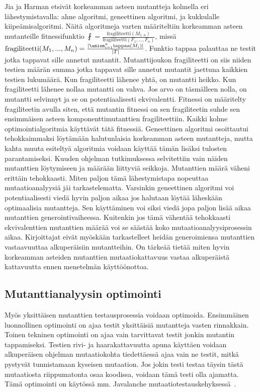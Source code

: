 \documentclass{tktltiki}
\begin{document}
Jia ja Harman etsivät korkeamman asteen mutantteja kolmella eri lähestymistavalla: ahne algoritmi, geneettinen algoritmi, ja kukkulalle kiipeämisalgoritmi. Näitä algoritmeja varten määriteltiin korkeamman asteen mutanteille fitnessifunktio $\fint = \frac{\text{fragiliteetti}({M_{1..n}})}{\text{fragiliteetti}({F_1, ..., F_n})}$, missä $\text{fragiliteetti}(M_1, ..., M_n) = \frac{|\union_{i=1}^{n} \text{tappaa}(M_i)|}{|T|}$. Funktio $\text{tappaa}$ palauttaa ne testit jotka tappavat sille annetut mutantit. Mutanttijoukon fragiliteetti on siis niiden testien määrän summa jotka tappavat sille annetut mutantit jaettuna kaikkien testien lukumäärä. Kun fragiliteetti lähenee yhtä, on mutantti heikko. Kun fragiliteetti lähenee nollaa mutantti on vahva. Jos arvo on täsmälleen nolla, on mutantti selvinnyt ja se on potentiaalisesti ekvivalentti. Fitnessi on määritelty fragiliteetin avulla siten, että mutantin fitnessi on sen fragiliteetin suhde sen ensimmäisen asteen komponenttimutanttien fragiliteettiin. Kaikki kolme optimointialgoritmia käyttävät tätä fitnessiä. Geneettinen algoritmi osoittautui tehokkaimmaksi löytämään halutunlaisia korkeamman asteen mutantteja, mutta kahta muuta esiteltyä algoritmia voidaan käyttää tämän lisäksi tulosten parantamiseksi. Kuuden ohjelman tutkimuksessa selvitettiin vain näiden mutanttien löytymiseen ja määrään liittyviä seikkoja. Mutanttien määrä väheni erittäin tehokkaasti. Miten paljon tämä lähestymistapa nopeuttaa mutaatioanalyysiä jäi tarkastelematta. Varsinkin geneettinen algoritmi voi potentiaalisesti viedä hyvin paljon aikaa jos halutaan löytää läheskään optimaalisia mutantteja. Sen käyttäminen voi siksi viedä jopa paljon lisää aikaa mutanttien generointivaiheessa. Kuitenkin jos tämä vähentää tehokkaasti ekvivalenttien mutanttien määrää voi se säästää koko mutaatioanalyysiprosessin aikaa. Kirjoittajat eivät myöskään tarkastelleet heidän generoimiensa mutanttien vastaavuuttaa alkuperäisiin mutantteihin. On tärkeää tietää miten hyvin korkeamman asteiden mutanttien mutaatiokattavuus vastaa alkuperäistä kattavuutta ennen menetelmän käyttöönottoa.

\subsection{Mutanttianalyysin optimointi}
Myös yksittäisen mutanttien testausprosessia voidaan optimoida. Ensimmäinen luonnollinen optimointi on ajaa testit yksittäisiä mutantteja vasten rinnakkain. Toinen tekninen optimointi on ajaa vain tarvittavat testit jonkin mutantin tappamiseksi. Testien rivi- ja haarakattavuutta apuna käyttäen voidaan alkuperäisen ohjelman mutaatiokohta tiedettäessä ajaa vain ne testit, mitkä pystyvät tunnistamaan kyseisen mutaation. Jos jokin testi testaa täysin tästä mutaatiosta riippumatonta osaa koodissa, voidaan tämä testi olla ajamatta. Tämä optimointi on käytössä mm. Javalanche mutaatiotestauskehyksessä~\cite{}.
\end{document}
